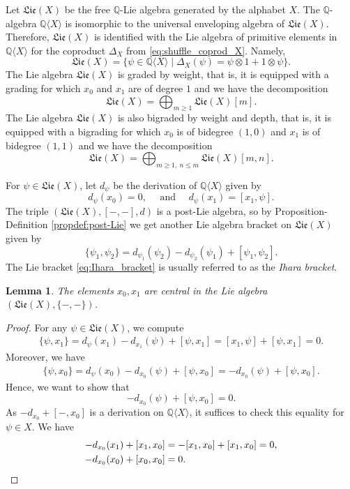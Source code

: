 \documentclass[11pt, a4paper]{amsart}
\newtheorem{lemma}[theorem]{Lemma}
\numberwithin{equation}{section}
\theoremstyle{definition}
\newcommand{\Q}{\mathbb{Q}}
\newcommand{\QX}{\Q\langle X\rangle}
\newcommand{\Lie}{\mathfrak{Lie}}
\begin{document}
Let $\Lie(X)$ be the free $\Q$-Lie algebra generated by the alphabet $X$. The $\Q$-algebra $\QX$ is isomorphic to the universal enveloping algebra of $\Lie(X)$. Therefore, $\Lie(X)$ is identified with the Lie algebra of primitive elements in $\QX$ for the coproduct $\Delta_X$ from \eqref{eq:shuffle_coprod_X}. Namely,
\[
    \Lie(X) = \{ \psi \in \QX \mid \Delta_X(\psi) = \psi \otimes 1 + 1 \otimes \psi \}.
\]
The Lie algebra $\Lie(X)$ is graded by weight, that is, it is equipped with a grading for which $x_0$ and $x_1$ are of degree $1$ and we have the decomposition
\[
    \Lie(X) = \bigoplus_{m \geq 1} \Lie(X)[m].
\]
The Lie algebra $\Lie(X)$ is also bigraded by weight and depth, that is, it is equipped with a bigrading for which $x_0$ is of bidegree $(1,0)$ and $x_1$ is of bidegree $(1,1)$ and we have the decomposition
\begin{equation} \label{eq:bigradecomp_LibX}
    \Lie(X) = \bigoplus_{m \geq 1, \ n \leq m} \Lie(X)[m,n].
\end{equation}

For $\psi \in \Lie(X)$, let $d_\psi$ be the derivation of $\QX$ given by
\begin{equation*} %
    d_{\psi}(x_0) = 0, \quad \text{ and } \quad d_\psi(x_1) = [x_1, \psi].
\end{equation*}
The triple $(\Lie(X),[-,-],d)$ is a post-Lie algebra, so by Proposition-Definition \ref{propdef:post-Lie} we get another Lie algebra bracket on $\Lie(X)$ given by
\begin{equation} \label{eq:Ihara_bracket}
\{\psi_1, \psi_2\} = d_{\psi_1}(\psi_2) - d_{\psi_2}(\psi_1) + [\psi_1, \psi_2].
\end{equation}
The Lie bracket \eqref{eq:Ihara_bracket} is usually referred to as the \emph{Ihara bracket}. 

\begin{lemma} \label{lem:Ihara_with_x0_x1}
The elements $x_0,x_1$ are central in the Lie algebra $(\Lie(X),\{-,-\})$.
\end{lemma}
\begin{proof} For any $\psi \in \Lie(X)$, we compute
\begin{align*} 
\{\psi,x_1\}=d_\psi(x_1)-d_{x_1}(\psi)+[\psi,x_1]=[x_1,\psi]+[\psi,x_1]=0.
\end{align*}
Moreover, we have
\begin{align*}
\{\psi,x_0\}=d_\psi(x_0)-d_{x_0}(\psi)+[\psi,x_0]=-d_{x_0}(\psi)+[\psi,x_0].
\end{align*}
Hence, we want to show that
\[-d_{x_0}(\psi)+[\psi,x_0]=0.\]
As $-d_{x_0}+[-,x_0]$ is a derivation on $\QX$, it suffices to check this equality for $\psi\in X$. We have
\begin{align*}
-d_{x_0}(x_1)+[x_1,x_0]&=-[x_1,x_0]+[x_1,x_0]=0, \\
-d_{x_0}(x_0)+[x_0,x_0]&=0.
\qedhere\end{align*}
\end{proof}
\end{document}

